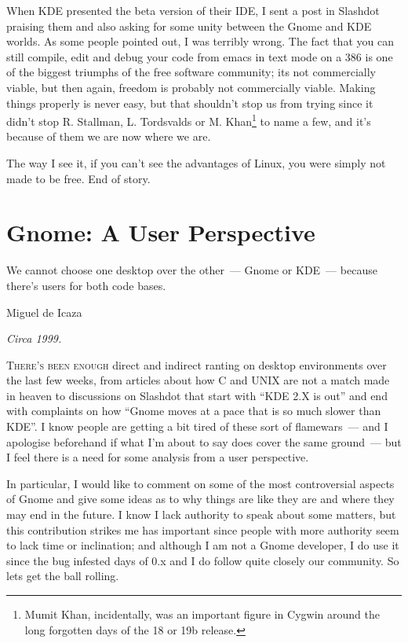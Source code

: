 \documentclass{book}
\begin{document}
When KDE presented the beta version of their IDE, I sent a post in
Slashdot praising them and also asking for some unity between the
Gnome and KDE worlds. As some people pointed out, I was terribly
wrong. The fact that you can still compile, edit and debug your code
from emacs in text mode on a 386 is one of the biggest triumphs of the
free software community; its not commercially viable, but then again,
freedom is probably not commercially viable. Making things properly is
never easy, but that shouldn't stop us from trying since it didn't
stop R. Stallman, L. Tordsvalds or M. Khan\footnote{Mumit Khan,
  incidentally, was an important figure in Cygwin around the long
  forgotten days of the 18 or 19b release.} to name a few, and it's
because of them we are now where we are.

The way I see it, if you can't see the advantages of Linux, you were
simply not made to be free. End of story.

\chapter{Gnome: A User Perspective}

\epigraph{We cannot choose one desktop over the other~--- Gnome or
  KDE~--- because there's users for both code bases.}{Miguel de Icaza}

\begin{flushright}
  \emph{Circa 1999.}
\end{flushright}

\lettrine{T}{here's been enough} direct and indirect ranting on
desktop environments over the last few weeks, from articles about how
C and UNIX are not a match made in heaven to discussions on Slashdot
that start with ``KDE 2.X is out'' and end with complaints on how
``Gnome moves at a pace that is so much slower than KDE''. I know
people are getting a bit tired of these sort of flamewars~--- and I
apologise beforehand if what I'm about to say does cover the same
ground~--- but I feel there is a need for some analysis from a user
perspective.

In particular, I would like to comment on some of the most
controversial aspects of Gnome and give some ideas as to why things
are like they are and where they may end in the future. I know I lack
authority to speak about some matters, but this contribution strikes
me has important since people with more authority seem to lack time or
inclination; and although I am not a Gnome developer, I do use it
since the bug infested days of 0.x and I do follow quite closely our
community. So lets get the ball rolling.
\end{document}
